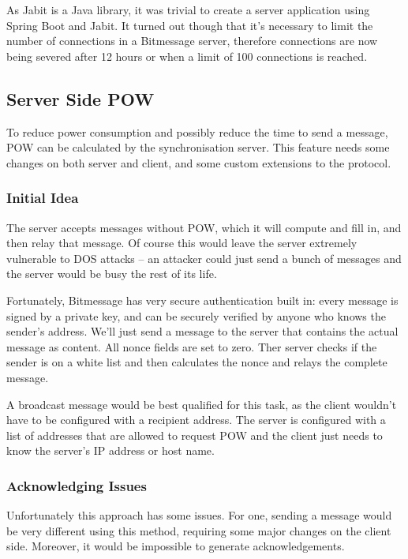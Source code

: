 \documentclass{bfh}
\begin{document}
  As Jabit is a Java library, it was trivial to create a server application using Spring Boot and Jabit. It turned out though that it's necessary to limit the number of connections in a Bitmessage server, therefore connections are now being severed after 12 hours or when a limit of 100 connections is reached.

  \subsection{Server Side \acl{POW}}
  To reduce power consumption and possibly reduce the time to send a message, \ac{POW} can be calculated by the synchronisation server. This feature needs some changes on both server and client, and some custom extensions to the protocol.

  \subsubsection{Initial Idea}
  The server accepts messages without \ac{POW}, which it will compute and fill in, and then relay that message. Of course this would leave the server extremely vulnerable to \ac{DOS} attacks -- an attacker could just send a bunch of messages and the server would be busy the rest of its life.

  Fortunately, Bitmessage has very secure authentication built in: every message is signed by a private key, and can be securely verified by anyone who knows the sender's address. We'll just send a message to the server that contains the actual message as content. All nonce fields are set to zero. Ther server checks if the sender is on a white list and then calculates the nonce and relays the complete message.

  A broadcast message would be best qualified for this task, as the client wouldn't have to be configured with a recipient address. The server is configured with a list of addresses that are allowed to request \ac{POW} and the client just needs to know the server's IP address or host name.

  \subsubsection{Acknowledging Issues}
  Unfortunately this approach has some issues. For one, sending a message would be very different using this method, requiring some major changes on the client side. Moreover, it would be impossible to generate acknowledgements.
\end{document}
